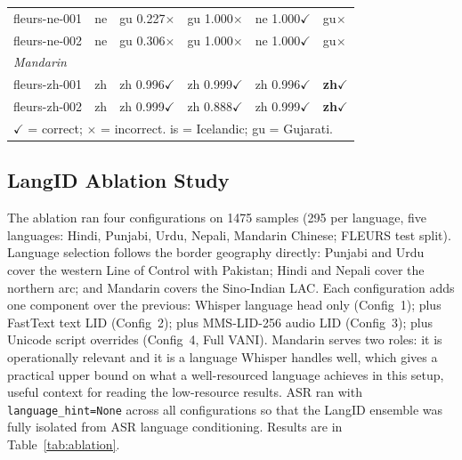 \documentclass[conference]{IEEEtran}
\begin{document}
\begin{table}[htbp]
\begin{center}
\begin{tabular}{p{2.0cm}lp{2.0cm}p{1.6cm}p{1.6cm}l}
fleurs-ne-001  & ne & gu 0.227$\times$ & gu 1.000$\times$ & ne 1.000$\checkmark$ & gu$\times$ \\
fleurs-ne-002  & ne & gu 0.306$\times$ & gu 1.000$\times$ & ne 1.000$\checkmark$ & gu$\times$ \\
\midrule
\multicolumn{6}{l}{\footnotesize\textit{Mandarin}} \\
fleurs-zh-001  & zh & zh 0.996$\checkmark$ & zh 0.999$\checkmark$ & zh 0.996$\checkmark$ & \textbf{zh}$\checkmark$ \\
fleurs-zh-002  & zh & zh 0.999$\checkmark$ & zh 0.888$\checkmark$ & zh 0.999$\checkmark$ & \textbf{zh}$\checkmark$ \\
\midrule
\multicolumn{6}{l}{\footnotesize$\checkmark$ = correct; $\times$ = incorrect. is = Icelandic; gu = Gujarati.} \\
\bottomrule
\end{tabular}
\end{center}
\end{table}

\subsection{LangID Ablation Study}
\label{sec:ablation}

The ablation ran four configurations on 1475 samples (295 per language, five languages: Hindi, Punjabi, Urdu, Nepali, Mandarin Chinese; FLEURS test split). Language selection follows the border geography directly: Punjabi and Urdu cover the western Line of Control with Pakistan; Hindi and Nepali cover the northern arc; and Mandarin covers the Sino-Indian LAC. Each configuration adds one component over the previous: Whisper language head only (Config~1); plus FastText text LID (Config~2); plus MMS-LID-256 audio LID (Config~3); plus Unicode script overrides (Config~4, Full VANI). Mandarin serves two roles: it is operationally relevant and it is a language Whisper handles well, which gives a practical upper bound on what a well-resourced language achieves in this setup, useful context for reading the low-resource results. ASR ran with \texttt{language\_hint=None} across all configurations so that the LangID ensemble was fully isolated from ASR language conditioning. Results are in Table~\ref{tab:ablation}.
\end{document}
